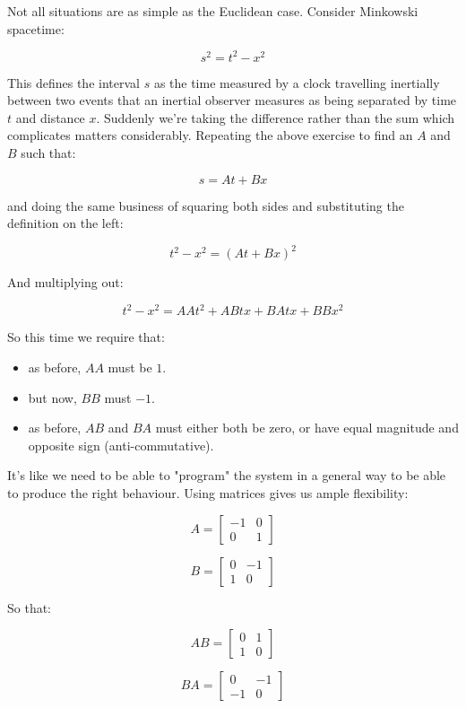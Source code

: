 Not all situations are as simple as the Euclidean case. Consider Minkowski spacetime:

$$s^2 = t^2 - x^2$$

This defines the interval $s$ as the time measured by a clock travelling inertially between two events that an inertial observer measures as being separated by time $t$ and distance $x$. Suddenly we're taking the difference rather than the sum which complicates matters considerably. Repeating the above exercise to find an $A$ and $B$ such that:

$$s = At + Bx$$

and doing the same business of squaring both sides and substituting the definition on the left:

$$t^2 - x^2 = (At + Bx)^2$$

And multiplying out:

$$t^2 - x^2 = AAt^2 + ABtx + BAtx + BBx^2$$

So this time we require that:

\begin{itemize}
    \item as before, $AA$ must be $1$.
    \item but now, $BB$ must $-1$.
    \item as before, $AB$ and $BA$ must either both be zero, or have equal magnitude and opposite sign (anti-commutative).
\end{itemize}

It's like we need to be able to "program" the system in a general way to be able to produce the right behaviour. Using matrices gives us ample flexibility:

$$A = \begin{bmatrix}-1 & 0 \\ 0 & 1\end{bmatrix}$$

$$B = \begin{bmatrix}0 & -1 \\ 1 & 0\end{bmatrix}$$

So that:

$$AB = \begin{bmatrix}0 & 1 \\ 1 & 0\end{bmatrix}$$

$$BA = \begin{bmatrix}0 & -1 \\ -1 & 0\end{bmatrix}$$

